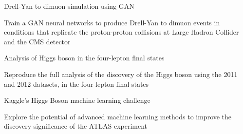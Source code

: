 

\begin{cventries}

      \cventry
      {Drell-Yan to dimuon simulation using GAN} %
    { } %
    {} %
    {} %
    {
      \begin{cvitems} %
        \item {Train a GAN neural networks to produce Drell-Yan to dimuon events in conditions that replicate the proton-proton collisions at Large Hadron Collider and the CMS detector}
        \end{cvitems}
    }
    

  \cventry
      {Analysis of Higgs boson in the four-lepton final states} %
    {} %
    {} %
    {} %
    {
      \begin{cvitems} %
        \item {Reproduce the full analysis of the discovery of the Higgs boson using the 2011 and 2012 datasets, in the four-lepton final states}
        \end{cvitems}
    }

    
      \cventry
      {Kaggle's Higgs Boson machine learning challenge} %
    { } %
    {} %
    {} %
    {
      \begin{cvitems} %
        \item {Explore the potential of advanced machine learning methods to improve the discovery significance of the ATLAS experiment}
        \end{cvitems}
    }
    
 

 

 
 

\end{cventries}
